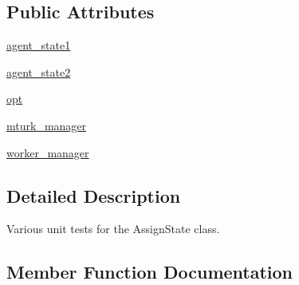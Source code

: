 \subsection*{Public Attributes}
\begin{DoxyCompactItemize}
\item 
\hyperlink{classparlai_1_1mturk_1_1core_1_1dev_1_1test_1_1test__mturk__agent_1_1TestAssignState_a589853e9394873d6856deb229b18082a}{agent\+\_\+state1}
\item 
\hyperlink{classparlai_1_1mturk_1_1core_1_1dev_1_1test_1_1test__mturk__agent_1_1TestAssignState_a7340c5a7f0f9fe67f28cd5d3b07d3328}{agent\+\_\+state2}
\item 
\hyperlink{classparlai_1_1mturk_1_1core_1_1dev_1_1test_1_1test__mturk__agent_1_1TestAssignState_a6ecc54a307bced8357ec0eadc718c3b6}{opt}
\item 
\hyperlink{classparlai_1_1mturk_1_1core_1_1dev_1_1test_1_1test__mturk__agent_1_1TestAssignState_a1e807a40fba4cee9b03fd4b30f9f56bf}{mturk\+\_\+manager}
\item 
\hyperlink{classparlai_1_1mturk_1_1core_1_1dev_1_1test_1_1test__mturk__agent_1_1TestAssignState_a5ca1ddc5c91095fcdf5a59e38387d91b}{worker\+\_\+manager}
\end{DoxyCompactItemize}


\subsection{Detailed Description}
\begin{DoxyVerb}Various unit tests for the AssignState class.
\end{DoxyVerb}
 

\subsection{Member Function Documentation}
\mbox{\label{classparlai_1_1mturk_1_1core_1_1dev_1_1test_1_1test__mturk__agent_1_1TestAssignState_af7b4822d80d66c964b745803fde3f041}} 
